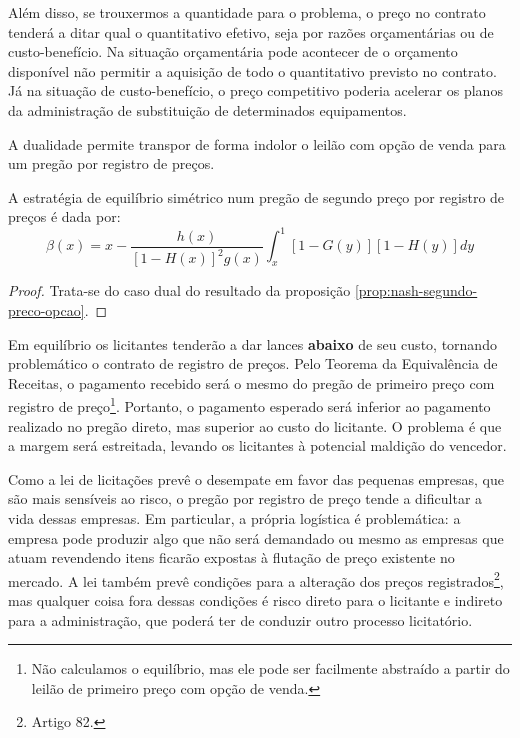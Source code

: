 Além disso, se trouxermos a quantidade para o problema, o preço no contrato tenderá a ditar qual o quantitativo efetivo, seja por razões orçamentárias ou de custo-benefício. Na situação orçamentária pode acontecer de o orçamento disponível não permitir a aquisição de todo o quantitativo previsto no contrato. Já na situação de custo-benefício, o preço competitivo poderia acelerar os planos da administração de substituição de determinados equipamentos.

A dualidade permite transpor de forma indolor o leilão com opção de venda para um pregão por registro de preços.

\begin{proposicao}
	\label{prop:nash-pregao-segundo-preco-rp}
	A estratégia de equilíbrio simétrico num pregão de segundo preço por registro de preços é dada por:
	\begin{equation}
		\beta(x) = x - \frac{h(x)}{[1-H(x)]^2 g(x)} \int_x^1 [1-G(y)][1-H(y)]dy
	\end{equation}
\end{proposicao}
\begin{proof}
	Trata-se do caso dual do resultado da proposição \ref{prop:nash-segundo-preco-opcao}.
\end{proof}

Em equilíbrio os licitantes tenderão a dar lances \textbf{abaixo} de seu custo, tornando problemático o contrato de registro de preços. Pelo Teorema da Equivalência de Receitas, o pagamento recebido será o mesmo do pregão de primeiro preço com registro de preço\footnote{Não calculamos o equilíbrio, mas ele pode ser facilmente abstraído a partir do leilão de primeiro preço com opção de venda.}. Portanto, o pagamento esperado será inferior ao pagamento realizado no pregão direto, mas superior ao custo do licitante. O problema é que a margem será estreitada, levando os licitantes à potencial maldição do vencedor.

Como a lei de licitações prevê o desempate em favor das pequenas empresas, que são mais sensíveis ao risco, o pregão por registro de preço tende a dificultar a vida dessas empresas. Em particular, a própria logística é problemática: a empresa pode produzir algo que não será demandado ou mesmo as empresas que atuam revendendo itens ficarão expostas à flutação de preço existente no mercado. A lei também prevê condições para a alteração dos preços registrados\footnote{Artigo 82.}, mas qualquer coisa fora dessas condições é risco direto para o licitante e indireto para a administração, que poderá ter de conduzir outro processo licitatório.

